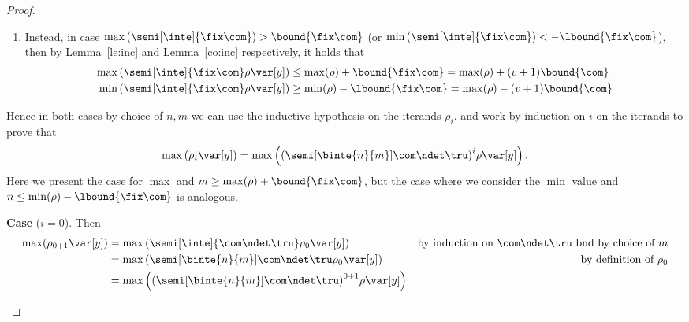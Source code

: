 \begin{proof}
\begin{enumerate}[label=(\roman*)]
\begin{enumerate}[label=(\alph*)]
    \item  Instead, in case
      \(\max\left(\semi[\inte]{\fix\com}\right) > \bound{\fix\com}\) (or
      \(\min\left(\semi[\inte]{\fix\com}\right) < -\lbound{\fix\com}\)),
      then by Lemma~\ref{le:inc} and Lemma~\ref{co:inc} respectively, it
      holds that
      \begin{align*}
        \max\left(\semi[\inte]{\fix\com}\rho\var[y]\right) & \leq \max(\rho) + \bound{\fix\com} = \max(\rho) + (v + 1)\bound{\com} \\
        \min\left(\semi[\inte]{\fix\com}\rho\var[y]\right) & \geq \min(\rho) - \lbound{\fix\com} = \max(\rho) - (v + 1)\bound{\com} 
      \end{align*}
    \end{enumerate}
    Hence in both cases by choice of \(n,m\) we can use the inductive
    hypothesis on the iterands \(\rho_i\). %
    and work by induction on \(i\) on the iterands to prove that
    \begin{equation*}
      \max\left(\rho_{i}\var[y]\right) = \max\left({\left(\semi[\binte{n}{m}]{\com\ndet\tru}\right)}^{i}\rho\var[y]\right).
    \end{equation*}
    Here we present the case for \(\max\) and
    \({m \geq \max(\rho) + \bound{\fix\com}}\), but the case where we
    consider the \(\min\) value and
    \({n \leq \min(\rho) - \lbound{\fix\com}}\) is analogous.
    
    \medskip
    
    \noindent
    \textbf{Case} (\(i=0\)).  Then
    \begin{align*}
      \max(\rho_{0+1}\var[y]) & = \max\left(\semi[\inte]{\com\ndet\tru}\rho_0\var[y]\right) & \text{by induction on } \com\ndet\tru \text{ bnd by choice of } m \\
                                  & = \max\left(\semi[\binte{n}{m}]{\com\ndet\tru}\rho_0\var[y]\right) & \text{by definition of } \rho_0 \\
                                  & = \max\left({\left(\semi[\binte{n}{m}]{\com\ndet\tru}\right)}^{0+1}\rho\var[y]\right) 
    \end{align*}

    \medskip


\end{enumerate}
\end{proof}
